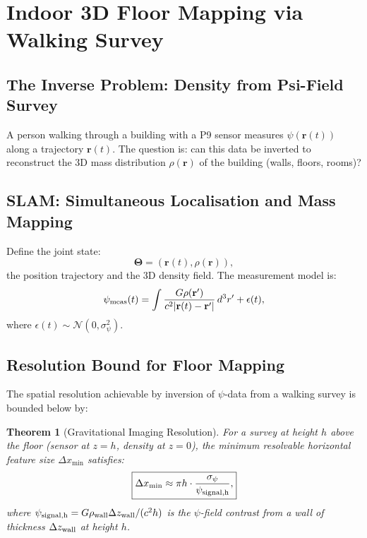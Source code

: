 \documentclass[aps,prd,twocolumn,superscriptaddress,nofootinbib]{revtex4-2}
\newtheorem{theorem}{Theorem}
\begin{document}
\section{Indoor 3D Floor Mapping via Walking Survey}
\label{sec:floor-mapping}

\subsection{The Inverse Problem: Density from Psi-Field Survey}

A person walking through a building with a P9 sensor measures
$\psi(\mathbf{r}(t))$ along a trajectory $\mathbf{r}(t)$.  The
question is: can this data be inverted to reconstruct the 3D mass
distribution $\rho(\mathbf{r})$ of the building (walls, floors, rooms)?

\subsection{SLAM: Simultaneous Localisation and Mass Mapping}

Define the joint state:
\begin{equation}
  \boldsymbol{\Theta} = (\mathbf{r}(t), \rho(\mathbf{r})),
  \label{eq:slam-state}
\end{equation}
the position trajectory and the 3D density field.  The measurement
model is:
\begin{equation}
  \psi_{\rm meas}(t) = \int \frac{G\rho(\mathbf{r}')}{c^2|\mathbf{r}(t) - \mathbf{r}'|}\,d^3r'
  + \epsilon(t),
  \label{eq:slam-meas}
\end{equation}
where $\epsilon(t) \sim \mathcal{N}(0, \sigma_\psi^2)$.

\subsection{Resolution Bound for Floor Mapping}

The spatial resolution achievable by inversion of $\psi$-data
from a walking survey is bounded below by:

\begin{theorem}[Gravitational Imaging Resolution]
\label{thm:resolution}
For a survey at height $h$ above the floor (sensor at $z = h$,
density at $z = 0$), the minimum resolvable horizontal feature size
$\Delta x_{\min}$ satisfies:
\begin{equation}
  \boxed{
  \Delta x_{\min} \approx \pi h
  \cdot \frac{\sigma_\psi}{\psi_{\rm signal,h}},
  }
  \label{eq:resolution}
\end{equation}
where $\psi_{\rm signal,h} = G\rho_{\rm wall}\Delta z_{\rm wall}/(c^2 h)$
is the $\psi$-field contrast from a wall of thickness $\Delta z_{\rm wall}$
at height $h$.
\end{theorem}
\end{document}
